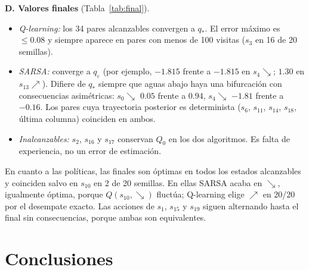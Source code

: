 \documentclass[11pt,a4paper]{article}
\newcommand{\UR}{{\nearrow}}
\newcommand{\DR}{{\searrow}}
\newcommand{\qe}{q_\varepsilon}
\begin{document}
\textbf{D. Valores finales} (Tabla~\ref{tab:final}).
\begin{itemize}\itemsep0pt
\item \emph{Q-learning:} los 34 pares alcanzables convergen a $q_*$. El error máximo es $\le0.08$ y siempre aparece en pares con menos de 100 visitas ($s_3$ en 16 de 20 semillas).
\item \emph{SARSA:} converge a $\qe$ (por ejemplo, $-1.815$ frente a $-1.815$ en $s_4\DR$; $1.30$ en $s_{13}\UR$). Difiere de $q_*$ siempre que aguas abajo haya una bifurcación con consecuencias asimétricas: $s_0\DR$ $0.05$ frente a $0.94$, $s_4\DR$ $-1.81$ frente a $-0.16$. Los pares cuya trayectoria posterior es determinista ($s_6$, $s_{11}$, $s_{14}$, $s_{18}$, última columna) coinciden en ambos.
\item \emph{Inalcanzables:} $s_2$, $s_{16}$ y $s_{17}$ conservan $Q_0$ en los dos algoritmos. Es falta de experiencia, no un error de estimación.
\end{itemize}

\begin{table}[!htbp]\centering\scriptsize\setlength{\tabcolsep}{2.8pt}

\caption{Valores finales (media temporal del último 25\,\%, 20 semillas; entre paréntesis, desviación típica temporal de SARSA) y visitas medianas $N$ (SARSA/QL). Estados inalcanzables omitidos: $Q=Q_0=0$ y $N=0$ en ambos.}
\label{tab:final}
\end{table}

En cuanto a las políticas, las finales son óptimas en todos los estados alcanzables y coinciden salvo en $s_{10}$ en 2 de 20 semillas. En ellas SARSA acaba en $\DR$, igualmente óptima, porque $Q(s_{10},\DR)$ fluctúa; Q-learning elige $\UR$ en 20/20 por el desempate exacto. Las acciones de $s_1$, $s_{15}$ y $s_{19}$ siguen alternando hasta el final sin consecuencias, porque ambas son equivalentes.

\section{Conclusiones}
\end{document}
